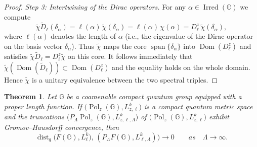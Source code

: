 \documentclass[12pt, reqno]{amsart}
\newtheorem{theorem}{Theorem}[section]
\theoremstyle{definition}
\theoremstyle{remark}
\numberwithin{equation}{section}
\begin{document}
\begin{proof}
\emph{Step 3: Intertwining of the Dirac operators.}  
For any $\alpha\in\operatorname{Irred}(\mathbb{G})$ we compute
\[
\tilde{\chi}\tilde{D}_\ell(\delta_\alpha) = \ell(\alpha)\,\tilde{\chi}(\delta_\alpha)
                                   = \ell(\alpha)\,\chi(\alpha)
                                   = D_\ell^z\,\tilde{\chi}(\delta_\alpha),
\]
where $\ell(\alpha)$ denotes the length of $\alpha$ (i.e., the eigenvalue of the 
Dirac operator on the basis vector $\delta_\alpha$). Thus $\tilde{\chi}$ maps the 
core $\operatorname{span}\{\delta_\alpha\}$ into $\operatorname{Dom}(D_\ell^z)$ 
and satisfies $\tilde{\chi}\tilde{D}_\ell = D_\ell^z\tilde{\chi}$ on this core. 
It follows immediately that $\tilde{\chi}(\operatorname{Dom}(\tilde{D}_\ell))
\subset\operatorname{Dom}(D_\ell^z)$ and the equality holds on the whole domain. 
Hence $\tilde{\chi}$ is a unitary equivalence between the two spectral triples.
\end{proof}

\begin{theorem}\label{Theorem5.5}
  Let $\mathbb{G}$ be a coamenable compact quantum group equipped with a proper length 
  function. If $\bigl(\operatorname{Pol}_z(\mathbb{G}), L_{z,\ell}^k\bigr)$ 
  is a compact quantum metric space and the  truncations $\bigl(P_\Lambda\operatorname{Pol}_z(\mathbb{G}), L_{z,\ell,\Lambda}^k\bigr)$ of 
  $\bigl(\operatorname{Pol}_z(\mathbb{G}), L_{z,\ell}^k\bigr)$ exhibit 
  Gromov--Hausdorff convergence, then 
  \[
  \operatorname{dist}_q\bigl(F(\mathbb{G}), L_{\ell}^k),\, 
  (P_\Lambda F(\mathbb{G}), L^k_{\ell,\Lambda})\bigr) \to 0 \qquad as \quad\Lambda\to \infty.
  \]
\end{theorem}
\end{document}
